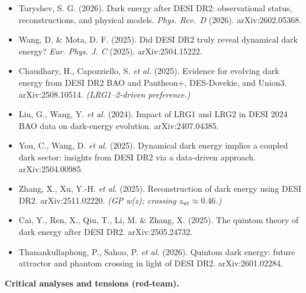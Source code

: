 \documentclass[
  10pt,
]{article}
\providecommand{\tightlist}{%
  \setlength{\itemsep}{0pt}\setlength{\parskip}{0pt}}
\begin{document}
\begin{itemize}
\tightlist
\item
  Turyshev, S. G. (2026). Dark energy after DESI DR2: observational
  status, reconstructions, and physical models. \emph{Phys. Rev.~D}
  (2026). arXiv:2602.05368.
\item
  Wang, D. \& Mota, D. F. (2025). Did DESI DR2 truly reveal dynamical
  dark energy? \emph{Eur. Phys. J. C} (2025). arXiv:2504.15222.
\item
  Chaudhary, H., Capozziello, S. \emph{et al.} (2025). Evidence for
  evolving dark energy from DESI DR2 BAO and Pantheon+, DES-Dovekie, and
  Union3. arXiv:2508.10514. \emph{(LRG1--2-driven preference.)}
\item
  Liu, G., Wang, Y. \emph{et al.} (2024). Impact of LRG1 and LRG2 in
  DESI 2024 BAO data on dark-energy evolution. arXiv:2407.04385.
\item
  You, C., Wang, D. \emph{et al.} (2025). Dynamical dark energy implies
  a coupled dark sector: insights from DESI DR2 via a data-driven
  approach. arXiv:2504.00985.
\item
  Zhang, X., Xu, Y.-H. \emph{et al.} (2025). Reconstruction of dark
  energy using DESI DR2. arXiv:2511.02220. \emph{(GP w(z); crossing
  \(z_{\mathrm{wt}} \approx  0.46\).)}
\item
  Cai, Y., Ren, X., Qiu, T., Li, M. \& Zhang, X. (2025). The quintom
  theory of dark energy after DESI DR2. arXiv:2505.24732.
\item
  Thanankullaphong, P., Sahoo, P. \emph{et al.} (2026). Quintom dark
  energy: future attractor and phantom crossing in light of DESI DR2.
  arXiv:2601.02284.
\end{itemize}

\textbf{Critical analyses and tensions (red-team).}
\end{document}

